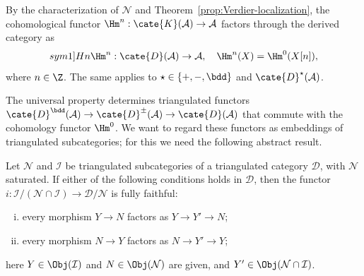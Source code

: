 By the characterization of $\mathcal{N}$ and
Theorem~\ref{prop:Verdier-localization}, the cohomological functor
$\Hm^n: \cate{K}(\mathcal{A}) \to \mathcal{A}$ factors through the derived
category as
\begin{equation*}
	\index[sym1]{Hn}
	\Hm^n: \cate{D}(\mathcal{A}) \to \mathcal{A}, \quad \Hm^n(X) = \Hm^0(X[n]),
\end{equation*}
where $n \in \Z$. The same applies to
$\star \in \{+, -, \bdd\}$ and $\cate{D}^{\star}(\mathcal{A})$.

The universal property determines triangulated functors
$\cate{D}^{\bdd}(\mathcal{A}) \to \cate{D}^{\pm}(\mathcal{A}) \to
\cate{D}(\mathcal{A})$ that commute with the cohomology functor $\Hm^0$. We
want to regard these functors as embeddings of triangulated subcategories;
for this we need the following abstract result.

\begin{lemma}\label{prop:N-D-full-faithful}
	Let $\mathcal{N}$ and $\mathcal{I}$ be triangulated subcategories of a
	triangulated category $\mathcal{D}$, with $\mathcal{N}$ saturated. If
	either of the following conditions holds in $\mathcal{D}$, then the
	functor
	$i: \mathcal{I}/(\mathcal{N} \cap \mathcal{I}) \to
	\mathcal{D}/\mathcal{N}$ is fully faithful:
	\begin{enumerate}[(i)]
		\item every morphism $Y \to N$ factors as $Y \to Y' \to N$;
		\item every morphism $N \to Y$ factors as $N \to Y' \to Y$;
	\end{enumerate}
	here $Y \in \Obj(\mathcal{I})$ and $N \in \Obj(\mathcal{N})$ are given,
	and $Y' \in \Obj(\mathcal{N} \cap \mathcal{I})$.
\end{lemma}

